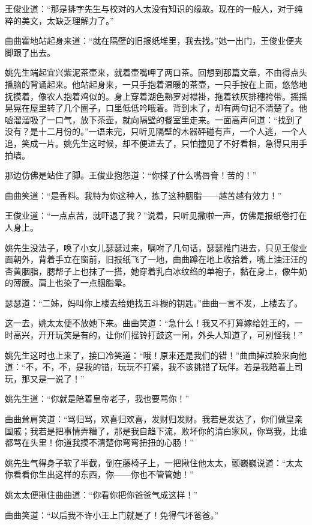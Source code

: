 \par 王俊业道：“那是排字先生与校对的人太没有知识的缘故。现在的一般人，对于纯粹的美文，太缺乏理解力了。”
\par 曲曲霍地站起身来道：“就在隔壁的旧报纸堆里，我去找。”她一出门，王俊业便夹脚跟了出去。
\par 姚先生端起宜兴紫泥茶壶来，就着壶嘴呷了两口茶。回想到那篇文章，不由得点头播脑的背诵起来。他站起身来，一只手抱着温暖的茶壶，一只手按在上面，悠悠地抚摸着，像农人抱着鸡似的。身上穿着湖色熟罗对襟褂，拖着铁灰排穗袴带。摇摇晃晃在屋里转了几个圈子，口里低低吟哦着。背到末了，却有两句记不清楚了。他嘘溜溜吸了一口气，放下茶壶，就向隔壁的餐室里走来。一面高声问道：“找到了没有？是十二月份的。”一语未完，只听见隔壁的木器砰碰有声，一个人逃，一个人追，笑成一片。姚先生这时候，却不便进去了，只怕撞见了不好看相，急得只用手拍墙。
\par 那边仿佛是站住了脚。王俊业抱怨道：“你搽了什么嘴唇膏！苦的！”
\par 曲曲笑道：“是香料。我特为你这种人，拣了这种胭脂——越苦越有效力！”
\par 王俊业道：“一点点苦，就吓退了我？”说着，只听见撒啦一声，仿佛是报纸卷打在人身上。
\par 姚先生没法子，唤了小女儿瑟瑟过来，嘱咐了几句话，瑟瑟推门进去，只见王俊业面朝外，背着手立在窗前，旧报纸飞了一地，曲曲蹲在地上收拾着，嘴上油汪汪的杏黄胭脂，腮帮子上也抹了一搭，她穿着乳白冰纹绉的单袍子，黏在身上，像牛奶的薄膜。肩上也染了一点胭脂晕。
\par 瑟瑟道：“二姊，妈叫你上楼去给她找五斗橱的钥匙。”曲曲一言不发，上楼去了。
\par 这一去，姚太太便不放她下来。曲曲笑道：“急什么！我又不打算嫁给姓王的，一时高兴，开开玩笑是有的，让你们摇铃打鼓这一闹，外头人知道了，可别怪我！”
\par 姚先生这时也上来了，接口冷笑道：“哦！原来还是我们的错！”曲曲掉过脸来向他道：“不，不，不，是我的错，玩玩不打紧，我不该挑错了玩伴。若是我陪着上司玩，那又是一说了！”
\par 姚先生道：“你就是陪着皇帝老子，我也要骂你！”
\par 曲曲耸肩笑道：“骂归骂，欢喜归欢喜，发财归发财。我若是发达了，你们做皇亲国戚；我若是把事情弄糟了，那是我自趋下流，败坏你的清白家风，你骂我，比谁都骂在头里！你道我摸不清楚你弯弯扭扭的心肠！”
\par 姚先生气得身子软了半截，倒在藤椅子上，一把揪住他太太，颤巍巍说道：“太太你看看你生出这样的东西，你——你也不管管她！”
\par 姚太太便揪住曲曲道：“你看你把你爸爸气成这样！”
\par 曲曲笑道：“以后我不许小王上门就是了！免得气坏爸爸。”
